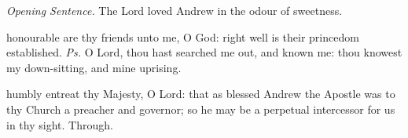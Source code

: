 \fancyhead[RO,LE]{}
\fancyhead[RE,LO]{}
{}
\par\noindent
\textit{Opening Sentence.} The Lord loved Andrew in the odour of sweetness.

\introit
{} honourable are thy friends unto me, O God: right well is their princedom established. \textit{Ps.} O Lord, thou hast searched me out, and known me: thou knowest my down-sitting, and mine uprising.

\collect
 humbly entreat thy Majesty, O Lord: that as blessed Andrew the Apostle was to thy Church a preacher and governor; so he may be a perpetual intercessor for us in thy sight. Through.

